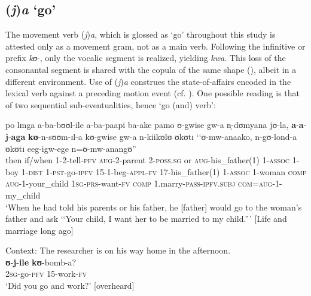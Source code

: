 \subsection{(\textit{\textit{j}})\textit{\textit{a}} `go'}\label{jaAspectualizer}
The movement verb (\textit{j})\textit{a}, which is glossed as `go' throughout this study is  attested only as a movement gram, not as a main verb. Following the infinitive or  prefix \textit{kʊ}-, only the vocalic segment is realized, yielding \textit{kwa}. This loss of the consonantal segment is shared with the copula of the same shape (), albeit in a different environment. Use of (\textit{j})\textit{a} construes the state-of-affairs encoded in the lexical verb against a preceding motion event (cf. \citealt[251]{WilkinsD1991}). One possible reading is that of two sequential sub-eventualities, hence \lq go (and) verb':

\begin{exe}
\ex \gll po lɪnga a-ba-bʊʊl-ile a-ba-paapi ba-ake pamo ʊ-gwise gw-a n̩-dʊmyana jʊ-la, \textbf{a}-\textbf{a}-\textbf{j}-\textbf{aga} \textbf{kʊ}-n-sʊʊm-ɪl-a kʊ-gwise gw-a n-kiikʊlʊ ʊkʊtɪ \textup{\lq\lq}ʊ-mw-anaako, n-gʊ-lond-a ʊkʊtɪ eeg-igw-ege n=ʊ-mw-anangʊ\textup{''}\\
then if/when 1-2-tell-\textsc{pfv} \textsc{aug}-2-parent 2-\textsc{poss.sg} or \textsc{aug}-his\_father(1) 1-\textsc{assoc} 1-boy 1-\textsc{dist} 1-\textsc{pst}-go-\textsc{ipfv} 15-1-beg-\textsc{appl}-\textsc{fv} 17-his\_father(1) 1-\textsc{assoc} 1-woman \textsc{comp} \phantom{\lq\lq}\textsc{aug}-1-your\_child \textsc{1sg}-\textsc{prs}-want-\textsc{fv} \textsc{comp} 1.marry-\textsc{pass}-\textsc{ipfv.subj} \textsc{com}=\textsc{aug}-1-my\_child\\
\glt \lq When he had told his parents or his father, he [father] would go to the woman's father and ask \lq\lq Your child, I want her to be married to my child.''{}' [Life and marriage long ago]

\ex Context: The researcher is on his way home in the afternoon.\\
\gll \textbf{ʊ}-\textbf{j}-\textbf{ile} \textbf{kʊ}-bomb-a?\\
\textsc{2sg}-go-\textsc{pfv} 15-work-\textsc{fv}\\
\glt \lq Did you go and work?' [overheard]
\end{exe}

